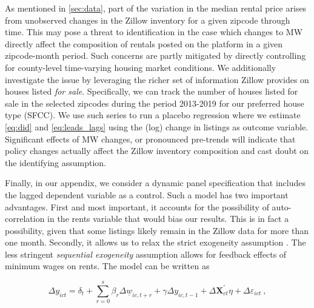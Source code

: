 As mentioned in \autoref{sec:data}, part of the variation in the median rental price arises 
from unobserved changes in the Zillow inventory for a given zipcode through time. This may 
pose a threat to identification in the case which changes to MW directly affect the composition 
of rentals posted on the platform in a given zipcode-month period. Such concerns are partly 
mitigated by directly controlling for county-level time-varying housing market conditions. We 
additionally investigate the issue by leveraging the richer set of information Zillow provides 
on houses listed \textit{for sale}. Specifically, we can track the number of houses listed for 
sale in the selected zipcodes during the period 2013-2019 for our preferred house type (SFCC). 
We use such series to run a placebo regression where we estimate \autoref{eq:did} and 
\autoref{eq:leads_lags} using the (log) change in listings as outcome variable. Significant 
effects of MW changes, or pronounced pre-trends will indicate that policy changes actually 
affect the Zillow inventory composition and cast doubt on the identifying assumption.

Finally, in our appendix, we consider a dynamic panel specification that includes the lagged
dependent variable as a control. Such a model has two important advantages. First and most 
important, it accounts for the possibility of auto-correlation in the rents variable that 
would bias our results. This is in fact a possibility, given that some listings likely remain 
in the Zillow data for more than one month. Secondly, it allows us to relax the strict 
exogeneity assumption \parencite{ArellanoHonore2001}. The less stringent \textit{sequential 
exogeneity} assumption allows for feedback effects of minimum wages on rents. The model 
can be written as

\begin{equation}\label{eq:ab_panel}
	\Delta y_{ict} = \delta_t
				   + \sum_{r=0}^{s} \beta_r \Delta \underline{w}_{ic,t+r}
				   + \gamma \Delta y_{ic,t-1} + \Delta \mathbf{X}^{'}_{ct}\eta
				   + \Delta \varepsilon_{ict} \ ,
\end{equation}


